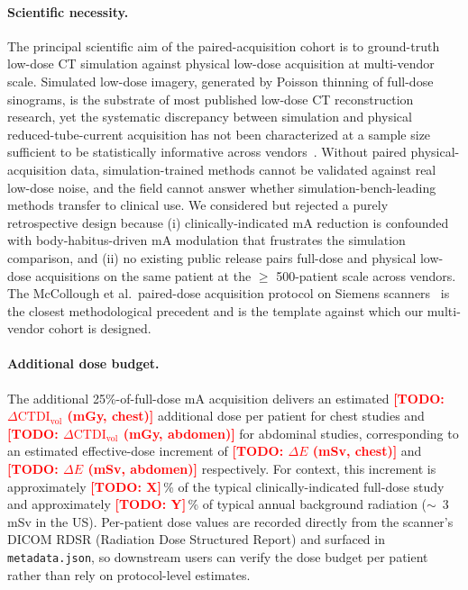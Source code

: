 \documentclass[twoside,11pt]{article}
\newcommand{\todo}[1]{\textcolor{red}{\textbf{[TODO: #1]}}}
\begin{document}
\paragraph{Scientific necessity.} The principal scientific aim of the paired-acquisition cohort is to ground-truth low-dose CT simulation against physical low-dose acquisition at multi-vendor scale. Simulated low-dose imagery, generated by Poisson thinning of full-dose sinograms, is the substrate of most published low-dose CT reconstruction research, yet the systematic discrepancy between simulation and physical reduced-tube-current acquisition has not been characterized at a sample size sufficient to be statistically informative across vendors~\citep{wang2020deeplearningreview}. Without paired physical-acquisition data, simulation-trained methods cannot be validated against real low-dose noise, and the field cannot answer whether simulation-bench-leading methods transfer to clinical use. We considered but rejected a purely retrospective design because (i) clinically-indicated mA reduction is confounded with body-habitus-driven mA modulation that frustrates the simulation comparison, and (ii) no existing public release pairs full-dose and physical low-dose acquisitions on the same patient at the $\geq$ 500-patient scale across vendors. The McCollough et al.\ paired-dose acquisition protocol on Siemens scanners~\citep{mccollough2020mayo} is the closest methodological precedent and is the template against which our multi-vendor cohort is designed.

\paragraph{Additional dose budget.} The additional 25\%-of-full-dose mA acquisition delivers an estimated \todo{$\Delta\textrm{CTDI}_{\textrm{vol}}$ (mGy, chest)} additional dose per patient for chest studies and \todo{$\Delta\textrm{CTDI}_{\textrm{vol}}$ (mGy, abdomen)} for abdominal studies, corresponding to an estimated effective-dose increment of \todo{$\Delta E$ (mSv, chest)} and \todo{$\Delta E$ (mSv, abdomen)} respectively. For context, this increment is approximately \todo{X}\,\% of the typical clinically-indicated full-dose study and approximately \todo{Y}\,\% of typical annual background radiation ($\sim$~3\,mSv in the US). Per-patient dose values are recorded directly from the scanner's DICOM RDSR (Radiation Dose Structured Report) and surfaced in \texttt{metadata.json}, so downstream users can verify the dose budget per patient rather than rely on protocol-level estimates.
\end{document}
